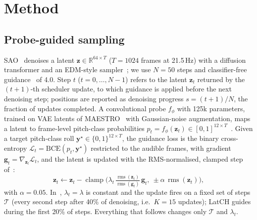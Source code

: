 \documentclass{article}
\def\z{{\mathbf z}}
\def\y{{\mathbf y}}
\def\g{{\mathbf g}}
\newcommand{\rms}{\operatorname{rms}}
\begin{document}
\section{Method}
\label{sec:method}

\subsection{Probe-guided sampling}
SAO~\cite{evans2024stableaudioopen} denoises a latent $\z\in\mathbb{R}^{64\times T}$ ($T{=}1024$ frames at 21.5\,Hz) with a diffusion transformer and an EDM-style sampler~\cite{karras2022edm}; we use $N{=}50$ steps and classifier-free guidance~\cite{ho2022cfg} of 4.0. Step $t$ ($t{=}0,\dots,N{-}1$) refers to the latent $\z_t$ returned by the $(t{+}1)$-th scheduler update, to which guidance is applied before the next denoising step; positions are reported as denoising progress $s{=}(t{+}1)/N$, the fraction of updates completed. A convolutional probe $f_\phi$ with 125k parameters, trained on VAE latents of MAESTRO~\cite{hawthorne2019maestro} with Gaussian-noise augmentation, maps a latent to frame-level pitch-class probabilities $p_t{=}f_\phi(\z_t)\in[0,1]^{12\times T}$~\cite{ye2026pitchclass}. Given a target pitch-class roll $\y^\star\in\{0,1\}^{12\times T}$, the guidance loss is the binary cross-entropy $\mathcal{L}_t{=}\mathrm{BCE}(p_t,\y^\star)$ restricted to the audible frames, with gradient $\g_t{=}\nabla_{\z_t}\mathcal{L}_t$, and the latent is updated with the RMS-normalised, clamped step of~\cite{ye2026pitchclass}:
\begin{equation}
\z_t \leftarrow \z_t - \operatorname{clamp}\!\Big(\lambda_t\,\tfrac{\rms(\z_t)}{\rms(\g_t)}\,\g_t,\ \pm\alpha\,\rms(\z_t)\Big),
\label{eq:update}
\end{equation}
with $\alpha{=}0.05$. In~\cite{ye2026pitchclass}, $\lambda_t{=}\lambda$ is constant and the update fires on a fixed set of steps $\mathcal{T}$ (every second step after 40\% of denoising, i.e.\ $K{=}15$ updates); LatCH guides during the first 20\% of steps. Everything that follows changes only $\mathcal{T}$ and $\lambda_t$.
\end{document}
